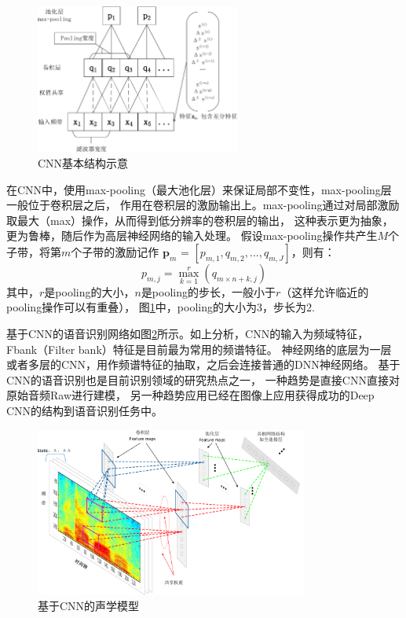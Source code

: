 \begin{figure}
\centering
\includegraphics[width=0.6\textwidth]{figures/chapter3/cnn-crop}
\caption{CNN基本结构示意}
\label{fig:cnn}
\end{figure}

在CNN中，使用max-pooling（最大池化层）来保证局部不变性，max-pooling层一般位于卷积层之后，
作用在卷积层的激励输出上。max-pooling通过对局部激励取最大（max）操作，从而得到低分辨率的卷积层的输出，
这种表示更为抽象，更为鲁棒，随后作为高层神经网络的输入处理。
假设max-pooling操作共产生$M$个子带，将第$m$个子带的激励记作
$\textbf{p}_m$ = $[p_{m,1}, q_{m,2}, ..., q_{m, J}]$，则有：
\begin{equation}
{p_{m,j}} = \mathop {\max }\limits_{k = 1}^r ({q_{m \times n + k,j}})
\end{equation}
其中，$r$是pooling的大小，$n$是pooling的步长，一般小于$r$（这样允许临近的pooling操作可以有重叠），
图\ref{fig:cnn}中，pooling的大小为3，步长为2.

基于CNN的语音识别网络如图\ref{fig:cnnasr}所示。如上分析，CNN的输入为频域特征，
Fbank（Filter bank）特征是目前最为常用的频谱特征。
神经网络的底层为一层或者多层的CNN，用作频谱特征的抽取，之后会连接普通的DNN神经网络。
基于CNN的语音识别也是目前识别领域的研究热点之一，
一种趋势是直接CNN直接对原始音频Raw进行建模，
另一种趋势应用已经在图像上应用获得成功的Deep CNN的结构到语音识别任务中。


\begin{figure}
\centering
\includegraphics[width=0.8\textwidth]{figures/chapter3/cnnasr-crop}
\caption{基于CNN的声学模型}
\label{fig:cnnasr}
\end{figure}

